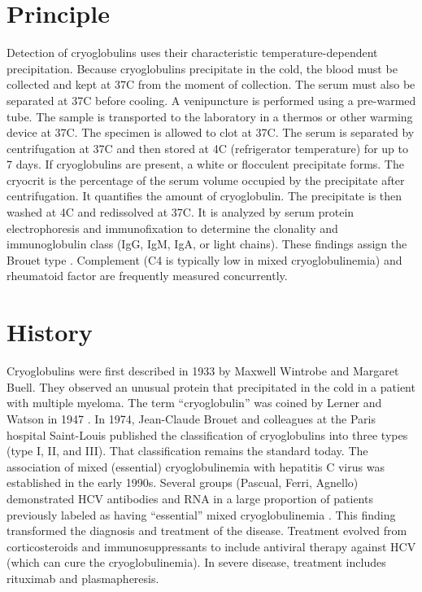 \section*{Principle}
Detection of cryoglobulins uses their characteristic temperature-dependent precipitation. Because cryoglobulins precipitate in the cold, the blood must be collected and kept at 37\textdegree{}C from the moment of collection. The serum must also be separated at 37\textdegree{}C before cooling. A venipuncture is performed using a pre-warmed tube. The sample is transported to the laboratory in a thermos or other warming device at 37\textdegree{}C. The specimen is allowed to clot at 37\textdegree{}C. The serum is separated by centrifugation at 37\textdegree{}C and then stored at 4\textdegree{}C (refrigerator temperature) for up to 7 days. If cryoglobulins are present, a white or flocculent precipitate forms. The cryocrit is the percentage of the serum volume occupied by the precipitate after centrifugation. It quantifies the amount of cryoglobulin. The precipitate is then washed at 4\textdegree{}C and redissolved at 37\textdegree{}C. It is analyzed by serum protein electrophoresis and immunofixation to determine the clonality and immunoglobulin class (IgG, IgM, IgA, or light chains). These findings assign the Brouet type \cite{tietz2023textbook}. Complement (C4 is typically low in mixed cryoglobulinemia) and rheumatoid factor are frequently measured concurrently.

\section*{History}
Cryoglobulins were first described in 1933 by Maxwell Wintrobe and Margaret Buell. They observed an unusual protein that precipitated in the cold in a patient with multiple myeloma. The term ``cryoglobulin'' was coined by Lerner and Watson in 1947 \cite{lerner1947studies}. In 1974, Jean-Claude Brouet and colleagues at the Paris hospital Saint-Louis published the classification of cryoglobulins into three types (type I, II, and III). That classification remains the standard today. The association of mixed (essential) cryoglobulinemia with hepatitis C virus was established in the early 1990s. Several groups (Pascual, Ferri, Agnello) demonstrated HCV antibodies and RNA in a large proportion of patients previously labeled as having ``essential'' mixed cryoglobulinemia \cite{agnello1992role,ferri2004mixed}. This finding transformed the diagnosis and treatment of the disease. Treatment evolved from corticosteroids and immunosuppressants to include antiviral therapy against HCV (which can cure the cryoglobulinemia). In severe disease, treatment includes rituximab and plasmapheresis.

